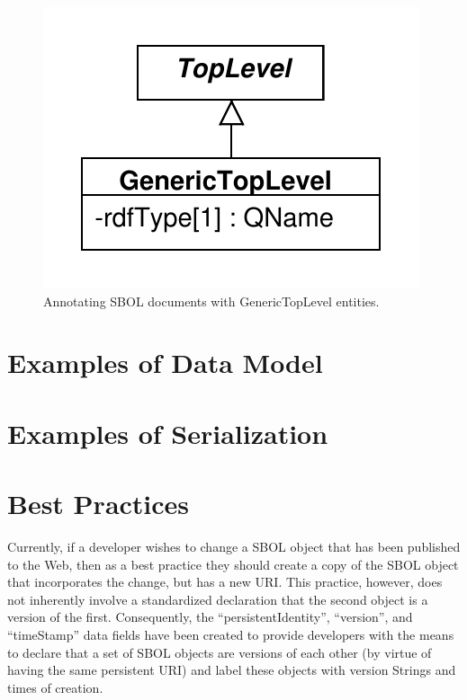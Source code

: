 \documentclass[draftspec]{sbmlpkgspec}
\begin{document}
\begin{figure}[!ht]
\begin{center}
\includegraphics[scale=0.8]{uml/generictoplevel}
\caption[]{Annotating SBOL documents with GenericTopLevel entities.}
\label{uml:generictoplevel}
\end{center}
\end{figure}


\section{Examples of Data Model}
\label{sec:examples}



\section{Examples of Serialization}

\section{Best Practices}
\label{sec:bestpractices}
Currently, if a developer wishes to change a SBOL object that has been published to the Web, then as a best practice they should create a copy of the SBOL object that incorporates the change, but has a new URI. This practice, however, does not inherently involve a standardized declaration that the second object is a version of the first. Consequently, the ``persistentIdentity'', ``version'', and ``timeStamp'' data fields have been created to provide developers with the means to declare that a set of SBOL objects are versions of each other (by virtue of having the same persistent URI) and label these objects with version Strings and times of creation.
\end{document}

